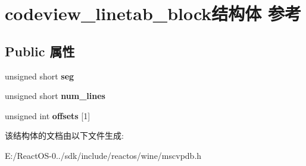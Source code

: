 \hypertarget{structcodeview__linetab__block}{}\section{codeview\+\_\+linetab\+\_\+block结构体 参考}
\label{structcodeview__linetab__block}
\subsection*{Public 属性}
\begin{DoxyCompactItemize}
\item 
\mbox{\label{structcodeview__linetab__block_a18c66d45d7e09e3c03be6be8b5f4fde6}} 
unsigned short {\bfseries seg}
\item 
\mbox{\label{structcodeview__linetab__block_ac6e8058d7c13b6d1ba33d50c4af1c9b8}} 
unsigned short {\bfseries num\+\_\+lines}
\item 
\mbox{\label{structcodeview__linetab__block_a3e246ba9300e4d477e2130612ea1ead4}} 
unsigned int {\bfseries offsets} \mbox{[}1\mbox{]}
\end{DoxyCompactItemize}


该结构体的文档由以下文件生成\+:\begin{DoxyCompactItemize}
\item 
E\+:/\+React\+O\+S-\/0../sdk/include/reactos/wine/mscvpdb.\+h\end{DoxyCompactItemize}
